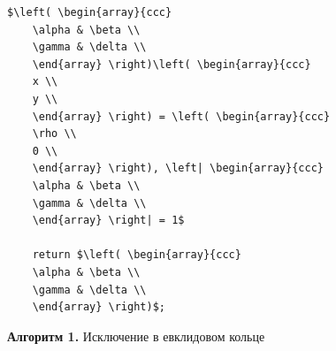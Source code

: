 \documentclass{mai_book}
\begin{document}
\begin{lstlisting}[mathescape=true]
    $\left( \begin{array}{ccc}
    \alpha & \beta \\
    \gamma & \delta \\
    \end{array} \right)\left( \begin{array}{ccc}
    x \\
    y \\
    \end{array} \right) = \left( \begin{array}{ccc}
    \rho \\
    0 \\
    \end{array} \right), \left| \begin{array}{ccc}
    \alpha & \beta \\
    \gamma & \delta \\
    \end{array} \right| = 1$

    return $\left( \begin{array}{ccc}
    \alpha & \beta \\
    \gamma & \delta \\
    \end{array} \right)$;

\end{lstlisting}
\begin{center}
{\bf Алгоритм 1.} Исключение в евклидовом кольце
\end{center}
\end{document}

